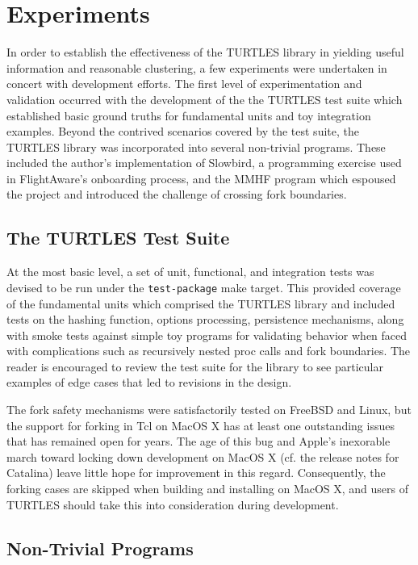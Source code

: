 \documentclass{article}[letter,10pt]
\begin{document}
\section{Experiments}{
  In order to establish the effectiveness of the TURTLES library in yielding useful information and reasonable clustering,
  a few experiments were undertaken in concert with development efforts. The first level of experimentation and validation
  occurred with the development of the the TURTLES test suite which established basic ground truths for fundamental units
  and toy integration examples. Beyond the contrived scenarios covered by the test suite, the TURTLES library was incorporated into
  several non-trivial programs. These included the author's implementation of Slowbird, a programming exercise used
  in FlightAware's onboarding process, and the MMHF program which espoused the project and introduced the challenge of
  crossing fork boundaries.

  \subsection{The TURTLES Test Suite}{
    At the most basic level, a set of unit, functional,
    and integration tests was devised to be run under the \texttt{test-package} make target. This provided coverage of
    the fundamental units which comprised the TURTLES library and included tests on the hashing function, options processing,
    persistence mechanisms, along with smoke tests against simple toy programs for validating behavior when faced with
    complications such as recursively nested proc calls and fork boundaries. The reader is encouraged to review the test
    suite for the library to see particular examples of edge cases that led to revisions in the design.

    The fork safety mechanisms were satisfactorily tested on FreeBSD and Linux, but the support for forking in Tcl on
    MacOS X has at least one outstanding issues that has remained open for years\autocite{c4e230f29b}. The age of this bug and Apple's
    inexorable march toward locking down development on MacOS X (cf. the release notes for Catalina\autocite{scriptsonmac})
    leave little hope for improvement in this regard. Consequently, the forking cases are skipped when building
    and installing on MacOS X, and users of TURTLES should take this into consideration during development.
  }

  \subsection{Non-Trivial Programs}{

}}
\end{document}

